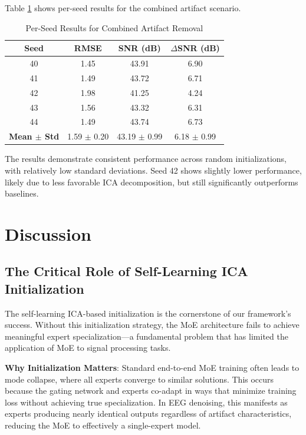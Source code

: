 \documentclass{article}
\begin{document}
Table \ref{tab:seeds} shows per-seed results for the combined artifact scenario.

\begin{table}[!t]
\centering
\caption{Per-Seed Results for Combined Artifact Removal}
\label{tab:seeds}
\begin{tabular}{cccc}
\toprule
\textbf{Seed} & \textbf{RMSE} & \textbf{SNR (dB)} & \textbf{$\Delta$SNR (dB)} \\
\midrule
40 & 1.45 & 43.91 & 6.90 \\
41 & 1.49 & 43.72 & 6.71 \\
42 & 1.98 & 41.25 & 4.24 \\
43 & 1.56 & 43.32 & 6.31 \\
44 & 1.49 & 43.74 & 6.73 \\
\midrule
\textbf{Mean $\pm$ Std} & 1.59 $\pm$ 0.20 & 43.19 $\pm$ 0.99 & 6.18 $\pm$ 0.99 \\
\bottomrule
\end{tabular}
\end{table}

The results demonstrate consistent performance across random initializations, with relatively low standard deviations. Seed 42 shows slightly lower performance, likely due to less favorable ICA decomposition, but still significantly outperforms baselines.




\section{Discussion}
\label{sec:discussion}

\subsection{The Critical Role of Self-Learning ICA Initialization}

The self-learning ICA-based initialization is the cornerstone of our framework's success. Without this initialization strategy, the MoE architecture fails to achieve meaningful expert specialization---a fundamental problem that has limited the application of MoE to signal processing tasks.

\textbf{Why Initialization Matters}: Standard end-to-end MoE training often leads to mode collapse, where all experts converge to similar solutions. This occurs because the gating network and experts co-adapt in ways that minimize training loss without achieving true specialization. In EEG denoising, this manifests as experts producing nearly identical outputs regardless of artifact characteristics, reducing the MoE to effectively a single-expert model.
\end{document}
